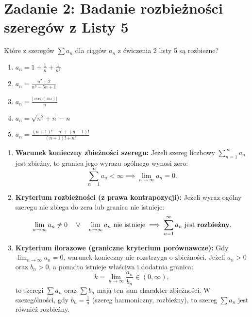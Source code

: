 \section{Zadanie 2: Badanie rozbieżności szeregów z Listy 5}
\label{sec:zadanie2}

\begin{tresczadania}
Które z szeregów $\sum a_n$ dla ciągów $a_n$ z ćwiczenia 2 listy 5 są rozbieżne?
\begin{enumerate}[label=(\alph*),leftmargin=2em]
    \item $\displaystyle a_n = 1 + \frac{1}{n} + \frac{1}{n^2}$
    \item $\displaystyle a_n = \frac{n^2+2}{n^3-5n+1}$
    \item $\displaystyle a_n = \frac{|\cos(\pi n)|}{n}$
    \item $\displaystyle a_n = \sqrt{n^2+n} - n$
    \item $\displaystyle a_n = \frac{(n+1)! - n! + (n-1)!}{(n+1)! + n!}$
\end{enumerate}
\end{tresczadania}

\vspace{0.2cm}

\begin{teoriabox}
\begin{enumerate}
    \item \textbf{Warunek konieczny zbieżności szeregu:}
    Jeżeli szereg liczbowy $\sum_{n=1}^{\infty} a_n$ jest zbieżny, to granica jego wyrazu ogólnego wynosi zero:
    \begin{equation}
        \sum_{n=1}^{\infty} a_n < \infty \implies \lim_{n \to \infty} a_n = 0.
        \label{eq:wk_zbieznosci}
    \end{equation}

    \item \textbf{Kryterium rozbieżności (z prawa kontrapozycji):}
    Jeżeli wyraz ogólny szeregu nie zbiega do zera lub granica nie istnieje:
    \begin{equation}
        \lim_{n \to \infty} a_n \neq 0 \quad \lor \quad \lim_{n \to \infty} a_n \text{ nie istnieje} \implies \sum_{n=1}^{\infty} a_n \text{ jest \textbf{rozbieżny}}.
        \label{eq:kryt_rozbieznosci}
    \end{equation}

    \item \textbf{Kryterium ilorazowe (graniczne kryterium porównawcze):}
    Gdy $\lim_{n \to \infty} a_n = 0$, warunek konieczny nie rozstrzyga o zbieżności. Jeżeli $a_n > 0$ oraz $b_n > 0$, a ponadto istnieje właściwa i dodatnia granica:
    \begin{equation}
        k = \lim_{n \to \infty} \frac{a_n}{b_n} \in (0, \infty),
        \label{eq:kryt_ilorazowe}
    \end{equation}
    to szeregi $\sum a_n$ oraz $\sum b_n$ mają ten sam charakter zbieżności. W szczególności, gdy $b_n = \frac{1}{n}$ (szereg harmoniczny, rozbieżny), to szereg $\sum a_n$ jest również rozbieżny.
\end{enumerate}
\end{teoriabox}

